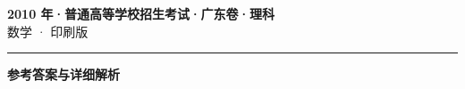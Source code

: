 \documentclass[zihao=5, a4paper]{ctexart}
\begin{document}
\begin{center}
  {\Large\bfseries 2010 年·普通高等学校招生考试·广东卷·理科}\\[4pt]
  {\large 数学 · 印刷版}
\end{center}
\medskip
{}

\par\bigskip\hrule\bigskip
{}
\begin{center}{\large\bfseries 参考答案与详细解析}\end{center}
\smallskip

\end{document}
